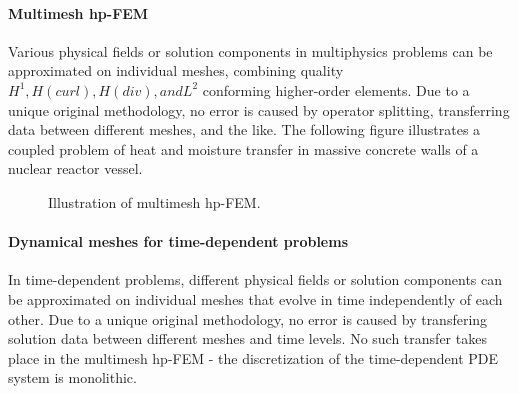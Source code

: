 \paragraph{Multimesh hp-FEM}
Various physical fields or solution components in multiphysics problems can be approximated on individual meshes, combining quality $H^1, H(curl), H(div), and L^2$ conforming higher-order elements. Due to a unique original methodology, no error is caused by operator splitting, transferring data between different meshes, and the like. The following figure illustrates a coupled problem of heat and moisture transfer in massive concrete walls of a nuclear reactor vessel.

\begin{figure}[!ht]
\centering
\caption{Illustration of multimesh hp-FEM.}
\label{fig:hermes_hm}
\end{figure}
\noindent

\paragraph{Dynamical meshes for time-dependent problems}
In time-dependent problems, different physical fields or solution components can be approximated on individual meshes that evolve in time independently of each other. Due to a unique original methodology, no error is caused by transfering solution data between different meshes and time levels. No such transfer takes place in the multimesh hp-FEM - the discretization of the time-dependent PDE system is monolithic.
